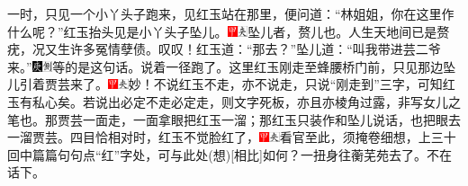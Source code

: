 一时，只见一个小丫头子跑来，见红玉站在那里，便问道：``林姐姐，你在这里作什么呢？''红玉抬头见是小丫头子坠儿。{\includegraphics[width=3mm]{../Images/00002}\includegraphics[width=3mm]{../Images/00012}\footnotesize \kaishu 坠儿者，赘儿也。人生天地间已是赘疣，况又生许多冤情孽债。叹叹！}红玉道：``那去？''坠儿道：``叫我带进芸二爷来。''{\includegraphics[width=3mm]{../Images/00004}\includegraphics[width=3mm]{../Images/00011}\footnotesize \kaishu 等的是这句话。}说着一径跑了。这里红玉刚走至蜂腰桥门前，只见那边坠儿引着贾芸来了。{\includegraphics[width=3mm]{../Images/00002}\includegraphics[width=3mm]{../Images/00012}\footnotesize \kaishu 妙！不说红玉不走，亦不说走，只说``刚走到''三字，可知红玉有私心矣。若说出必定不走必定走，则文字死板，亦且亦棱角过露，非写女儿之笔也。}那贾芸一面走，一面拿眼把红玉一溜；那红玉只装作和坠儿说话，也把眼去一溜贾芸。四目恰相对时，红玉不觉脸红了，{{\includegraphics[width=3mm]{../Images/00002}\includegraphics[width=3mm]{../Images/00012}\footnotesize \kaishu 看官至此，须掩卷细想，上三十回中篇篇句句点``红''字处，可与此处{(想)}{[}相比{]}如何？}}一扭身往蘅芜苑去了。不在话下。

